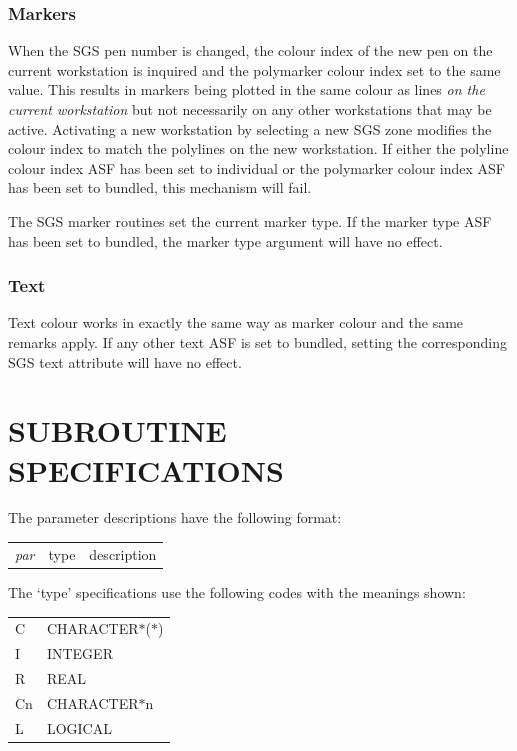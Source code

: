 \documentclass[11pt]{starlink}
\begin{document}
\subsubsection* {Markers}

When the SGS pen number is changed, the colour index of the new pen on the
current workstation is inquired and the polymarker colour index set to the same
value.
This results in markers being plotted in the same colour as lines \emph{on the
current workstation}\/ but not necessarily on any other workstations that may be
active.
Activating a new workstation by selecting a new SGS zone modifies the colour
index to match the polylines on the new workstation.
If either the polyline colour index ASF has been set to individual or the
polymarker colour index ASF has been set to bundled, this mechanism will fail.

The SGS marker routines set the current marker type.
If the marker type ASF has been set to bundled, the marker type argument will
have no effect.

\subsubsection* {Text}

Text colour works in exactly the same way as marker colour and the same remarks
apply.
If any other text ASF is set to bundled, setting the corresponding SGS text
attribute will have no effect.

\section {SUBROUTINE SPECIFICATIONS}\label{app-subroutines}

The parameter descriptions have the following format:

\begin{tabular}{lll}
\em par&type&description
\end{tabular}

The `type' specifications use the following codes with the meanings shown:
\begin{center}
\begin{tabular}{ll}
C&CHARACTER$\ast$($\ast$) \\
I&INTEGER\\
R&REAL\\
Cn&CHARACTER$\ast$n\\
L&LOGICAL\\
\end{tabular}
\end{center}
\end{document}
